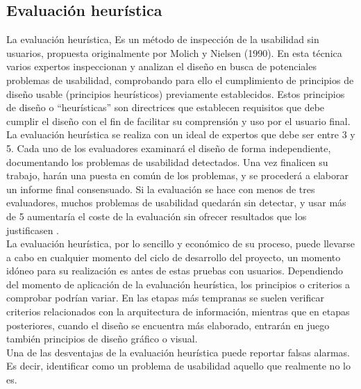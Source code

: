 \subsection{Evaluación heurística}
La evaluación heurística, Es un método de inspección de la usabilidad sin usuarios, propuesta originalmente por Molich y Nielsen (1990). En esta técnica varios expertos inspeccionan y analizan el diseño en busca de potenciales problemas de usabilidad, comprobando para ello el cumplimiento de principios de diseño usable (principios heurísticos) previamente establecidos. Estos principios de diseño o “heurísticas” son directrices que establecen requisitos que debe cumplir el diseño con el fin de facilitar su comprensión y uso por el usuario final.\\
La evaluación heurística se realiza con un ideal de expertos que debe ser entre 3 y 5. Cada uno de los evaluadores examinará el diseño de forma independiente, documentando los problemas de usabilidad detectados. Una vez finalicen su trabajo, harán una puesta en común de los problemas, y se procederá a elaborar un informe final consensuado. Si la evaluación se hace con menos de tres evaluadores, muchos problemas de usabilidad quedarán sin detectar, y usar más de 5 aumentaría el coste de la evaluación sin ofrecer resultados que los justificasen \cite{gonzalez2001evaluacion}.\\
La evaluación heurística, por lo sencillo y económico de su proceso, puede llevarse a cabo en cualquier momento del ciclo de desarrollo del proyecto, un momento idóneo para su realización es antes de estas pruebas con usuarios. Dependiendo del momento de aplicación de la evaluación heurística, los principios o criterios a comprobar podrían variar. En las etapas más tempranas se suelen verificar criterios relacionados con la arquitectura de información, mientras que en etapas posteriores, cuando el diseño se encuentra más elaborado, entrarán en juego también principios de diseño gráfico o visual.\\
Una de las desventajas de la evaluación heurística puede reportar falsas alarmas. Es decir, identificar como un problema de usabilidad aquello que realmente no lo es.
